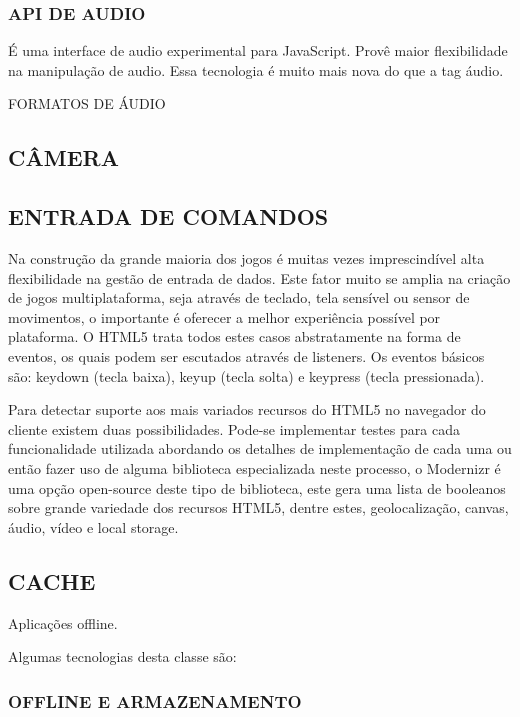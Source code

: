 \documentclass[11pt,a4paper]{article}
\begin{document}
\subsubsection{API DE AUDIO}

É uma interface de audio experimental para JavaScript. Provê maior
flexibilidade na manipulação de audio. Essa tecnologia é muito mais
nova do que a tag áudio. 

FORMATOS DE ÁUDIO

\subsection{CÂMERA}

\subsection{ ENTRADA DE COMANDOS}

Na construção da grande maioria dos jogos é muitas vezes
imprescindível alta flexibilidade na gestão de entrada de dados.
Este fator muito se amplia na criação de jogos multiplataforma,
seja através de teclado, tela sensível ou sensor de movimentos, o
importante é oferecer a melhor experiência possível por plataforma.
O HTML5 trata todos estes casos abstratamente na forma de eventos, os
quais podem ser escutados através de listeners. Os eventos básicos
são: keydown (tecla baixa), keyup (tecla solta) e keypress (tecla
pressionada).

Para detectar suporte aos mais variados recursos do HTML5 no navegador
do cliente existem duas possibilidades. Pode-se implementar testes para
cada funcionalidade utilizada abordando os detalhes de implementação
de cada uma ou então fazer uso de alguma biblioteca especializada
neste processo, o Modernizr é uma opção open-source deste tipo de
biblioteca, este gera uma lista de booleanos sobre grande variedade dos
recursos HTML5, dentre estes, geolocalização, canvas, áudio, vídeo e
local storage.

\subsection{CACHE}

Aplicações offline.

Algumas tecnologias desta classe são:

\subsubsection{ OFFLINE E ARMAZENAMENTO}
\end{document}
